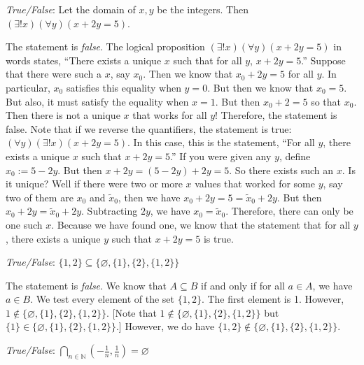 \documentclass[11pt,letterpaper]{article}
\begin{document}
\quizsol \textit{True/False}: Let the domain of $x, y$ be the integers. Then $(\exists! x)(\forall y)(x + 2y= 5)$. \pspace

\sol The statement is \textit{false}. The logical proposition $(\exists! x)(\forall y)(x + 2y= 5)$ in words states, ``There exists a unique $x$ such that for all $y$, $x + 2y= 5$.'' Suppose that there were such a $x$, say $x_0$. Then we know that $x_0 + 2y= 5$ for all $y$. In particular, $x_0$ satisfies this equality when $y= 0$. But then we know that $x_0= 5$. But also, it must satisfy the equality when $x= 1$. But then $x_0 + 2= 5$ so that $x_0$. Then there is not a unique $x$ that works for all $y$! Therefore, the statement is false. Note that if we reverse the quantifiers, the statement is true: $(\forall y)(\exists! x)(x + 2y= 5)$. In this case, this is the statement, ``For all $y$, there exists a unique $x$ such that $x + 2y= 5$.'' If you were given any $y$, define $x_0:= 5 - 2y$. But then $x + 2y= (5 - 2y) + 2y= 5$. So there exists such an $x$. Is it unique? Well if there were two or more $x$ values that worked for some $y$, say two of them are $x_0$ and $\tilde{x}_0$, then we have $x_0 + 2y= 5= \tilde{x}_0 + 2y$. But then $x_0 + 2y= \tilde{x}_0 + 2y$. Subtracting $2y$, we have $x_0 = \tilde{x}_0$. Therefore, there can only be one such $x$. Because we have found one, we know that the statement that for all $y$, there exists a unique $y$ such that $x + 2y= 5$ is true. 





\newpage





\quizsol \textit{True/False}:  $\{ 1, 2 \} \subseteq \{ \varnothing, \{ 1 \}, \{ 2 \}, \{ 1, 2 \} \}$ \pspace

\sol The statement is \textit{false}. We know that $A \subseteq B$ if and only if for all $a \in A$, we have $a \in B$. We test every element of the set $\{ 1, 2 \}$. The first element is 1. However, $1 \notin \{ \varnothing, \{ 1 \}, \{ 2 \}, \{ 1, 2 \} \}$. [Note that $1 \notin \{ \varnothing, \{ 1 \}, \{ 2 \}, \{ 1, 2 \} \}$ but $\{ 1 \} \in \{ \varnothing, \{ 1 \}, \{ 2 \}, \{ 1, 2 \} \}$.] However, we do have $\{ 1, 2 \} \notin \{ \varnothing, \{ 1 \}, \{ 2 \}, \{ 1, 2 \} \}$. \pvspace{1.5cm}


\quizsol \textit{True/False}: $\displaystyle\bigcap_{n \in \mathbb{N}} \left( -\frac{1}{n}, \frac{1}{n} \right)= \varnothing$ \pspace
\end{document}
